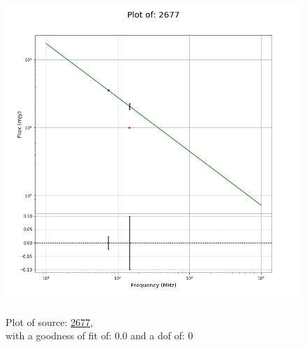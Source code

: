 \documentclass{article}
\begin{document}
\begin{figure}[H]
\begin{minipage}{0.5\textwidth}
        \includegraphics[scale = 0.35]{KmeulenTrap4P23_1hr/1hr2677.png}
        \captionsetup{labelformat=empty}
        \caption{Plot of source: \href{http://banana.transientskp.org/r4/vlo_KmeulenTrap4P23/runningcatalog/2677}{2677},\\with a goodness of fit of: 0.0 and a dof of: 0}
    \addtocounter{figure}{-1}
    \label{KmeulenTrap4P23:1hr:2677:plot}
    \end{minipage}
\end{figure}
\end{document}
